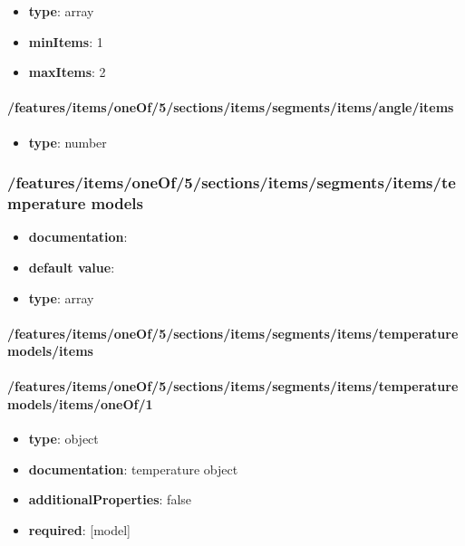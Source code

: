 \begin{itemize}\item {\bf type}: array
\item {\bf minItems}: 1
\item {\bf maxItems}: 2
\end{itemize}\paragraph{/features/items/oneOf/5/sections/items/segments/items/angle/items}
\begin{itemize}\item {\bf type}: number
\end{itemize}\subsubsection{/features/items/oneOf/5/sections/items/segments/items/temperature models}
\begin{itemize}\item {\bf documentation}: 
\item {\bf default value}: 
\item {\bf type}: array
\end{itemize}\paragraph{/features/items/oneOf/5/sections/items/segments/items/temperature models/items}

\paragraph{/features/items/oneOf/5/sections/items/segments/items/temperature models/items/oneOf/1}
\begin{itemize}\item {\bf type}: object
\item {\bf documentation}: temperature object
\item {\bf additionalProperties}: false
\item {\bf required}: [model]\end{itemize}
